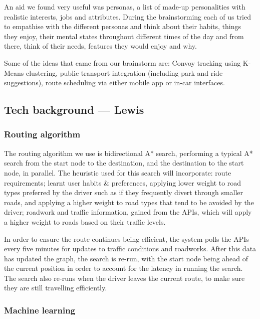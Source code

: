 \documentclass{article}
\begin{document}
An aid we found very useful was personas, a list of made-up personalities with realistic interests, jobs and attributes. During the brainstorming each of us tried to empathise with the different personas and think about their habits, things they enjoy, their mental states throughout different times of the day and from there, think of their needs, features they would enjoy and why.

Some of the ideas that came from our brainstorm are: Convoy tracking using K-Means clustering, public transport integration (including park and ride suggestions), route scheduling via either mobile app or in-car interfaces.

\subsection{Tech background --- Lewis}\label{ssec:nav-tech}
\subsubsection{Routing algorithm}\label{sssec:nav-tech-routing}
The routing algorithm we use is bidirectional A* search, performing a typical A* search from the start node to the destination, and the destination to the start node, in parallel. The heuristic used for this search will incorporate:
route requirements;
learnt user habits \& preferences, applying lower weight to road types preferred by the driver such as if they frequently divert through smaller roads, and applying a higher weight to road types that tend to be avoided by the driver;
roadwork and traffic information, gained from the APIs, which will apply a higher weight to roads based on their traffic levels.

In order to ensure the route continues being efficient, the system polls the APIs every five minutes for updates to traffic conditions and roadworks. After this data has updated the graph, the search is re-run, with the start node being ahead of the current position in order to account for the latency in running the search. The search also re-runs when the driver leaves the current route, to make sure they are still travelling efficiently.
\subsubsection{Machine learning}\label{sssec:nav-tech-machinelearning}
%
%
\end{document}
